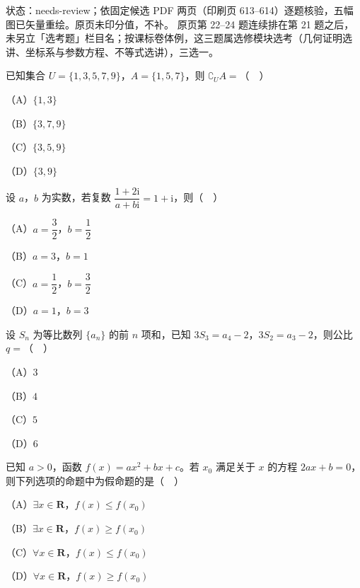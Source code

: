状态：needs-review；依固定候选 PDF 两页（印刷页 613–614）逐题核验，五幅图已矢量重绘。原页未印分值，不补。
原页第 22–24 题连续排在第 21 题之后，未另立「选考题」栏目名；按课标卷体例，这三题属选修模块选考（几何证明选讲、坐标系与参数方程、不等式选讲），三选一。
\begin{question}
已知集合 $U=\{1,3,5,7,9\}$，$A=\{1,5,7\}$，则 $\complement_U A=$（　）

（A）$\{1,3\}$

（B）$\{3,7,9\}$

（C）$\{3,5,9\}$

（D）$\{3,9\}$

\end{question}
\begin{question}
设 $a$，$b$ 为实数，若复数 $\dfrac{1+2\mathrm i}{a+b\mathrm i}=1+\mathrm i$，则（　）

（A）$a=\dfrac32$，$b=\dfrac12$

（B）$a=3$，$b=1$

（C）$a=\dfrac12$，$b=\dfrac32$

（D）$a=1$，$b=3$

\end{question}
\begin{question}
设 $S_n$ 为等比数列 $\{a_n\}$ 的前 $n$ 项和，已知 $3S_3=a_4-2$，$3S_2=a_3-2$，则公比 $q=$（　）

（A）$3$

（B）$4$

（C）$5$

（D）$6$

\end{question}
\begin{question}
已知 $a>0$，函数 $f(x)=ax^2+bx+c$。若 $x_0$ 满足关于 $x$ 的方程 $2ax+b=0$，则下列选项的命题中为假命题的是（　）

（A）$\exists x\in\mathbf R$，$f(x)\leqslant f(x_0)$

（B）$\exists x\in\mathbf R$，$f(x)\geqslant f(x_0)$

（C）$\forall x\in\mathbf R$，$f(x)\leqslant f(x_0)$

（D）$\forall x\in\mathbf R$，$f(x)\geqslant f(x_0)$

\Needspace{0.4\textheight}
\end{question}
\begingroup
\renewenvironment{question}{\Needspace{0.5\textheight}}{}
